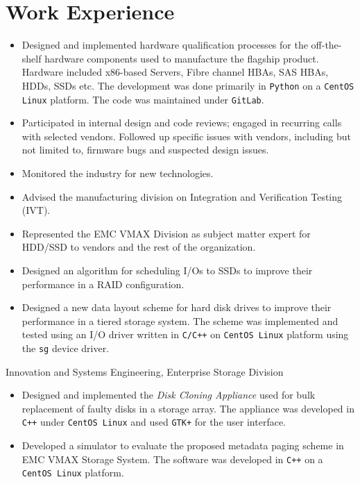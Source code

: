 \section{Work Experience}

{
	\begin{itemize}
		\item Designed and implemented hardware qualification processes for the
			off-the-shelf hardware components used to manufacture the flagship
			product. Hardware included x86-based Servers, Fibre channel HBAs,
			SAS HBAs, HDDs, SSDs etc.  The development was done primarily in \texttt{Python}
			on a \texttt{CentOS Linux} platform. The code was maintained under \texttt{GitLab}.
		\item Participated in internal design and code reviews; engaged in
			recurring calls with selected vendors. Followed up specific issues 
			with vendors, including but not limited to, firmware bugs and
			suspected design issues.
		\item  Monitored the industry for new technologies.
		\item Advised the manufacturing division on Integration and Verification Testing (IVT).
	\end{itemize}
}
{
	\begin{itemize}
		\item Represented the EMC VMAX Division as subject matter expert for HDD/SSD to vendors
			and the rest of the organization.
		\item Designed an algorithm for scheduling I/Os to SSDs to improve
			their performance in a RAID configuration.
		\item Designed a new data layout scheme for hard disk drives to improve
			their performance in a tiered storage system.
			The scheme was implemented and tested using an I/O driver written
			in \texttt{C/C++} on \texttt{CentOS Linux} platform using the \texttt{sg} device driver.
	\end{itemize}
}
{Innovation and Systems Engineering, Enterprise Storage Division}
{
	\begin{itemize}
        \item Designed and implemented the {\em Disk Cloning Appliance} used for bulk
            replacement of faulty disks in a storage array. The appliance was
			developed in \texttt{C++} under \texttt{CentOS Linux} and used \texttt{GTK+} for the user
			interface.
		\item Developed a simulator to evaluate the proposed metadata paging
			scheme in EMC VMAX Storage System. The software was developed in
			\texttt{C++} on a \texttt{CentOS Linux} platform.
	\end{itemize}
}
